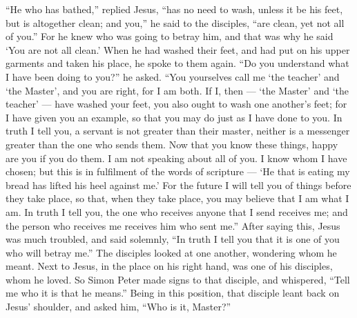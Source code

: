  ``He who has bathed,'' replied Jesus, ``has no need to
wash, unless it be his feet, but is altogether clean; and you,'' he said
to the disciples, ``are clean, yet not all of you.''  For
he knew who was going to betray him, and that was why he said `You are
not all clean.'  When he had washed their feet, and had put
on his upper garments and taken his place, he spoke to them again. ``Do
you understand what I have been doing to you?'' he asked. 
``You yourselves call me `the teacher' and `the Master', and you are
right, for I am both.  If I, then --- `the Master' and `the
teacher' --- have washed your feet, you also ought to wash one another's
feet;  for I have given you an example, so that you may do
just as I have done to you.  In truth I tell you, a servant
is not greater than their master, neither is a messenger greater than
the one who sends them.  Now that you know these things,
happy are you if you do them.  I am not speaking about all
of you. I know whom I have chosen; but this is in fulfilment of the
words of scripture --- `He that is eating my bread has lifted his heel
against me.'  For the future I will tell you of things
before they take place, so that, when they take place, you may believe
that I am what I am.  In truth I tell you, the one who
receives anyone that I send receives me; and the person who receives me
receives him who sent me.''  After saying this, Jesus was
much troubled, and said solemnly, ``In truth I tell you that it is one
of you who will betray me.''  The disciples looked at one
another, wondering whom he meant.  Next to Jesus, in the
place on his right hand, was one of his disciples, whom he loved.
 So Simon Peter made signs to that disciple, and whispered,
``Tell me who it is that he means.''  Being in this
position, that disciple leant back on Jesus' shoulder, and asked him,
``Who is it, Master?''

